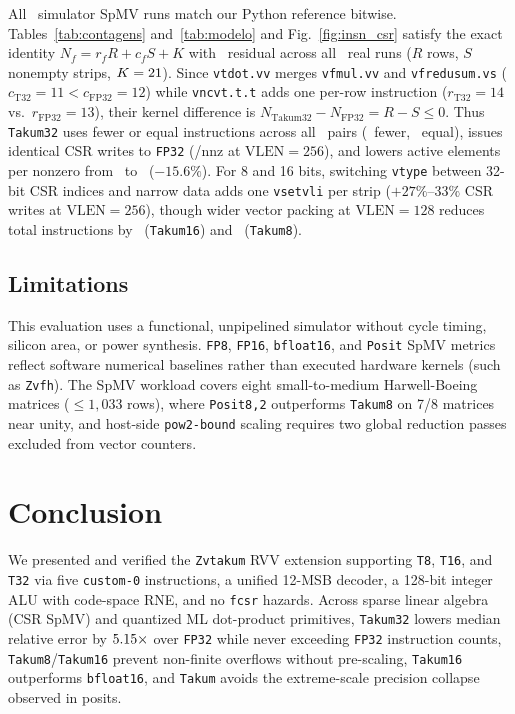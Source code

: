\documentclass[conference]{IEEEtran}
\begin{document}
All \NumBitExatas\ simulator SpMV runs match our Python reference bitwise. Tables~\ref{tab:contagens} and~\ref{tab:modelo} and Fig.~\ref{fig:insn_csr} satisfy the exact identity $N_f = r_f R + c_f S + K$ with \ModResiduoMax\ residual across all \ModExec\ real runs ($R$ rows, $S$ nonempty strips, $K=21$). Since \texttt{vtdot.vv} merges \texttt{vfmul.vv} and \texttt{vfredusum.vs} ($c_{\text{T32}}=11 < c_{\text{FP32}}=12$) while \texttt{vncvt.t.t} adds one per-row instruction ($r_{\text{T32}}=14$ vs.\ $r_{\text{FP32}}=13$), their kernel difference is $N_{\text{Takum32}} - N_{\text{FP32}} = R - S \le 0$. Thus \texttt{Takum32} uses fewer or equal instructions across all \InsnPares\ pairs (\InsnMenorTrinta\ fewer, \InsnIgualTrinta\ equal), issues identical CSR writes to \texttt{FP32} (\CsrNnzTrintaDuzentos/nnz at $\mathrm{VLEN}=256$), and lowers active elements per nonzero from \ElemNnzFP\ to \ElemNnzTakum\ ($-15.6\%$). For 8 and 16 bits, switching \texttt{vtype} between 32-bit CSR indices and narrow data adds one \texttt{vsetvli} per strip ($+27\%\text{--}33\%$ CSR writes at $\mathrm{VLEN}=256$), though wider vector packing at $\mathrm{VLEN}=128$ reduces total instructions by \RelInsnDezCento\ (\texttt{Takum16}) and \RelInsnOitoCento\ (\texttt{Takum8}).

\subsection{Limitations}
This evaluation uses a functional, unpipelined simulator without cycle timing, silicon area, or power synthesis. \texttt{FP8}, \texttt{FP16}, \texttt{bfloat16}, and \texttt{Posit} SpMV metrics reflect software numerical baselines rather than executed hardware kernels (such as \texttt{Zvfh}). The SpMV workload covers eight small-to-medium Harwell-Boeing matrices ($\le 1{,}033$ rows), where \texttt{Posit8,2} outperforms \texttt{Takum8} on 7/8 matrices near unity, and host-side \texttt{pow2-bound} scaling requires two global reduction passes excluded from vector counters.

\section{Conclusion}
We presented and verified the \texttt{Zvtakum} RVV extension supporting \texttt{T8}, \texttt{T16}, and \texttt{T32} via five \texttt{custom-0} instructions, a unified 12-MSB decoder, a 128-bit integer ALU with code-space RNE, and no \texttt{fcsr} hazards. Across sparse linear algebra (CSR SpMV) and quantized ML dot-product primitives, \texttt{Takum32} lowers median relative error by $5.15\times$ over \texttt{FP32} while never exceeding \texttt{FP32} instruction counts, \texttt{Takum8}/\texttt{Takum16} prevent non-finite overflows without pre-scaling, \texttt{Takum16} outperforms \texttt{bfloat16}, and \texttt{Takum} avoids the extreme-scale precision collapse observed in posits.
\end{document}
